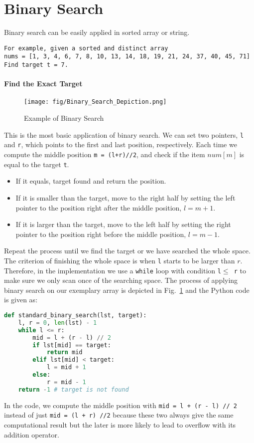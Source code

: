 \documentclass[main.tex]{subfiles}
\begin{document}
  
\section{Binary Search}
Binary search can be easily applied in sorted array or string. 
\begin{lstlisting}[numbers=none]
For example, given a sorted and distinct array
nums = [1, 3, 4, 6, 7, 8, 10, 13, 14, 18, 19, 21, 24, 37, 40, 45, 71]
Find target t = 7.
\end{lstlisting}
\paragraph{Find the Exact Target}
\begin{figure}[H]
    \centering
    \texttt{[image: fig/Binary\_Search\_Depiction.png]}
    \caption{Example of Binary Search}
    \label{fig:binary_search_eg_1}
\end{figure}

This is the most basic application of binary search. We can set two pointers, \texttt{l} and \texttt{r}, which points to the first and last position, respectively. Each time we compute the middle position \texttt{m = (l+r)//2}, and check if the item $num[m]$ is equal to the target \texttt{t}. 
\begin{itemize}
\item If it equals, target found and return the position. 
\item If it is smaller than the target, move to the right half by setting the left pointer to the position right after the middle position, $l = m + 1$. 
\item If it is larger than the target, move to the left half by setting the right pointer to the position right before the middle position, $l = m - 1$. 
\end{itemize}
Repeat the process until we find the target or we have searched the whole space. The criterion of finishing the whole space is when \texttt{l} starts to be larger than $r$. Therefore, in the implementation we use a \texttt{while} loop with condition \texttt{l$\leq$ r} to make sure we only scan once of the searching space. The process of applying binary search on our exemplary array is depicted in Fig.~\ref{fig:binary_search_eg_1} and the Python code is given as:
\begin{lstlisting}[language=Python]
def standard_binary_search(lst, target):
    l, r = 0, len(lst) - 1
    while l <= r:
        mid = l + (r - l) // 2
        if lst[mid] == target:
            return mid
        elif lst[mid] < target:
            l = mid + 1
        else:
            r = mid - 1
    return -1 # target is not found 
\end{lstlisting}
In the code, we compute the middle position with \texttt{mid = l + (r - l) // 2} instead of just \texttt{mid = (l + r) //2} because these two always give the same computational result but the later is more likely to lead to overflow with its addition operator.
\end{document}
